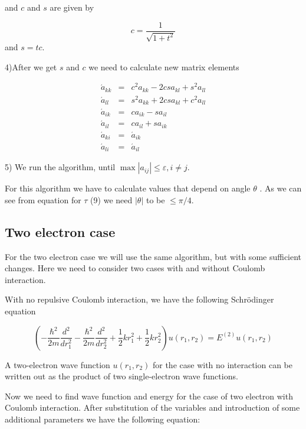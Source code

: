 \documentclass[10pt]{article}
\begin{document}
and $c$ and $s$ are given by

\begin{equation}
c=\frac{1}{\sqrt{1+t^{2}}}
\end{equation}
and $s=tc$. 

4)After we get $s$ and $c$ we need to calculate new matrix elements



\begin{eqnarray}
\acute{a}_{kk} &=&c^{2}a_{kk}-2csa_{kl}+s^{2}a_{ll} \\
\acute{a}_{ll} &=&s^{2}a_{kk}+2csa_{kl}+c^{2}a_{ll} \\
\acute{a}_{ik} &=&ca_{ik}-sa_{il} \\
\acute{a}_{il} &=&ca_{il}+sa_{ik} \\
\acute{a}_{ki} &=&\acute{a}_{ik} \\
\acute{a}_{li} &=&\acute{a}_{il}
\end{eqnarray}

5) We run the algorithm, until $\max \left\vert a_{ij}\right\vert \leq
\varepsilon ,i\neq j.$


For this algorithm we have to calculate values that depend on angle $\theta $%
. As we can see from equation for $\tau$ (9) we need  $|\theta |$ to be $\leq
\pi /4$. 

\subsection{Two electron case}
For the two electron case  we will use the same algorithm, but with some
sufficient changes. Here we need to consider two cases with and without
Coulomb interaction.

With no repulsive Coulomb interaction, we have the following Schr\"{o}dinger
equation

\begin{equation}
	\left( -\frac{\hbar ^{2}}{2m}\frac{d^{2}}{dr_{1}^{2}}-\frac{\hbar ^{2}}{2m}%
	\frac{d^{2}}{dr_{2}^{2}}+\frac{1}{2}kr_{1}^{2}+\frac{1}{2}kr_{2}^{2}\right)
	u(r_{1},r_{2})=E^{(2)}u(r_{1},r_{2})
\end{equation}

	A two-electron wave function $u(r_{1},r_{2})$ for the case with no
	interaction can be written out as the product of two single-electron wave
	functions.
	
	Now we need to find wave function and energy for the case of two electron
	with Coulomb interaction. After substitution of the variables and
	introduction of some additional parameters we have the following equation:
	
\end{document}

